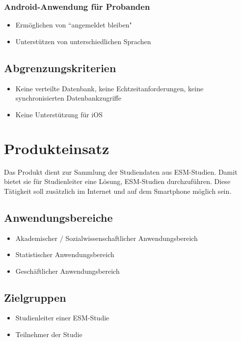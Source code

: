\documentclass[a4paper]{scrreprt}
\begin{document}
            \subsection{Android-Anwendung f\"ur Probanden}
                \begin{itemize}
                    \item Erm\"oglichen von ``angemeldet bleiben"
                    \item Unterst\"utzen von unterschiedlichen Sprachen
                \end{itemize}
                \vspace*{0.5cm}


        \section{Abgrenzungskriterien}
            \begin{itemize}
                \item Keine verteilte Datenbank, keine Echtzeitanforderungen, keine synchronisierten Datenbankzugriffe
                \item Keine Unterst\"utzung f\"ur iOS
            \end{itemize}

    \chapter{Produkteinsatz}
        Das Produkt dient zur Sammlung der Studiendaten aus ESM-Studien. Damit bietet sie für \gls{Studienleiter} eine Lösung, ESM-Studien durchzuführen. Diese Tätigkeit soll zusätzlich im Internet und auf dem Smartphone möglich sein.

        \section{Anwendungsbereiche}
            \begin{itemize}
                \item Akademischer / Sozialwissenschaftlicher Anwendungsbereich
                \item Statistischer Anwendungsbereich
                \item Geschäftlicher Anwendungsbereich
            \end{itemize}

        \section{Zielgruppen}
            \begin{itemize}
                \item \gls{Studienleiter} einer ESM-Studie
                \item Teilnehmer der Studie
            \end{itemize}
\end{document}
